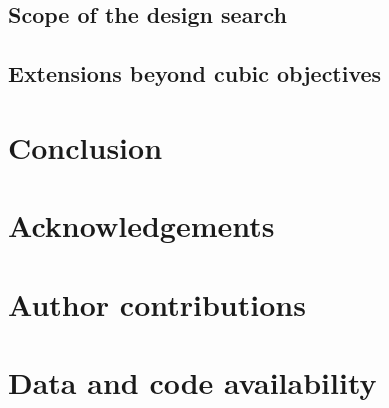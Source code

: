 \documentclass[a4paper,onecolumn,11pt,unpublished]{quantumarticle}
\newcommand{\blankcontent}{\noindent\mbox{}\par}
\theoremstyle{remark}
\begin{document}
\subsection{Scope of the design search}
\label{sec:discussion-search-scope}



\subsection{Extensions beyond cubic objectives}

\section{Conclusion}
\label{sec:conclusion}


\section*{Acknowledgements}
\blankcontent

\section*{Author contributions}
\blankcontent

\section*{Data and code availability}
\blankcontent
\end{document}
